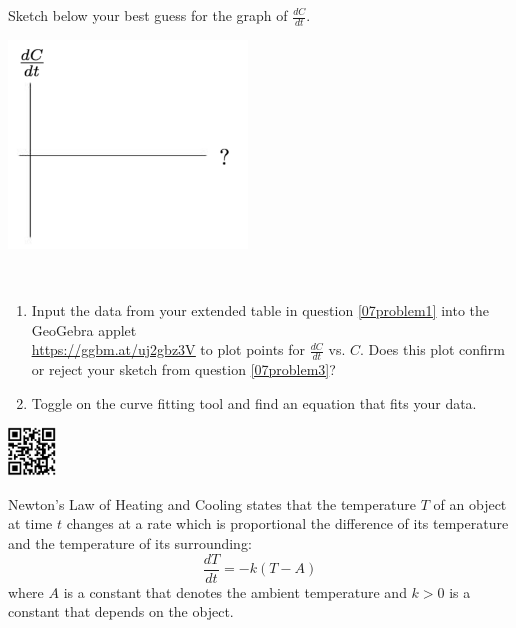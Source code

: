 \item Sketch below your best guess for the graph of $\displaystyle\frac{dC}{dt}$. \label{07problem3}
\begin{center}
\includegraphics[width=2.5in]{Originals/07/07dCdt.png}
\end{center}
    
\clearpage
{}

\item \
\begin{enumerate} \label{07problem4} 
\item Input the data from your extended table in question \ref{07problem1} into the GeoGebra applet \\\href{https://ggbm.at/uj2gbz3V}{\underline{https://ggbm.at/uj2gbz3V}} to plot points for $\displaystyle\frac{dC}{dt}$ vs. $C$. Does this plot confirm or reject your sketch from question \ref{07problem3}? 
\vspace{1.5in}
\item Toggle on the curve fitting tool and find an equation that fits your data.
\end{enumerate} 
\ee

\vspace{-2in}\hspace{-0.5in}\includegraphics[width=0.5in]{Originals/07/07CoolingCoffeeQR.png}
\vfill


\bbox
\alert{Newton's Law of Heating and Cooling} states that the temperature $T$ of an object at time $t$
changes at a rate which is proportional the difference of its temperature and the
temperature of its surrounding:
\[ \frac{dT}{dt} = -k(T-A) \]
 where $A$ is a constant that denotes the ambient temperature and $k>0$ is a constant that depends on the object.
\ebox

